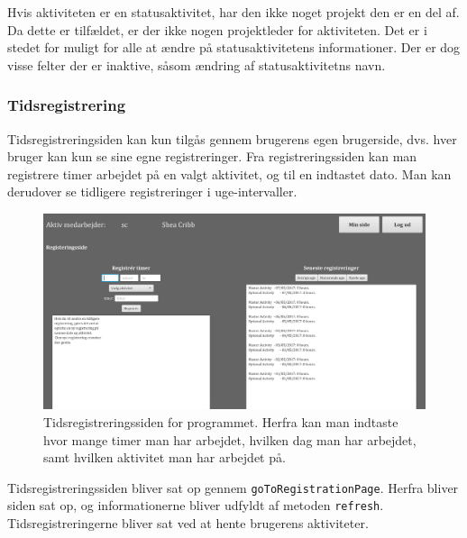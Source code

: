 Hvis aktiviteten er en statusaktivitet, har den ikke noget projekt den er en del af. Da dette er tilfældet, er der ikke nogen projektleder for aktiviteten. Det er i stedet for muligt for alle at ændre på statusaktivitetens informationer. Der er dog visse felter der er inaktive, såsom ændring af statusaktivitetns navn.


\subsubsection{Tidsregistrering}
Tidsregistreringsiden kan kun tilgås gennem brugerens egen brugerside, dvs. hver bruger kan kun se sine egne registreringer. Fra registreringssiden kan man registrere timer arbejdet på en valgt aktivitet, og til en indtastet dato. Man kan derudover se tidligere registreringer i uge-intervaller. 

\begin{figure}[H]
    \centering
    \includegraphics[width = \textwidth]{Figurer/registrationPage}
    \caption{Tidsregistreringssiden for programmet. Herfra kan man indtaste hvor mange timer man har arbejdet, hvilken dag man har arbejdet, samt hvilken aktivitet man har arbejdet på.}
    \label{fig:registrationPage}
\end{figure}

Tidsregistreringssiden bliver sat op gennem \texttt{goToRegistrationPage}. Herfra bliver siden sat op, og informationerne bliver udfyldt af metoden \texttt{refresh}. Tidsregistreringerne bliver sat ved at hente brugerens aktiviteter. 